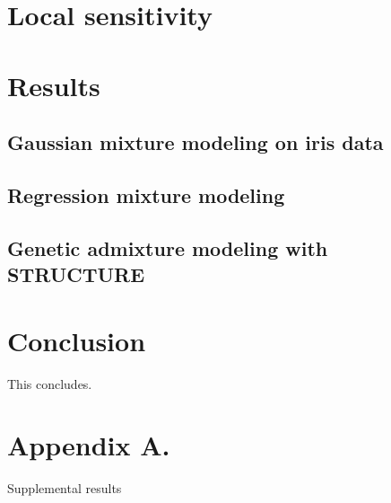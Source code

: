 \documentclass[twoside,11pt]{article}
\begin{document}
\section{Local sensitivity}


\section{Results}

\subsection{Gaussian mixture modeling on iris data}


\subsection{Regression mixture modeling}


\subsection{Genetic admixture modeling with STRUCTURE}


\section{Conclusion}
This concludes.




\newpage

\appendix
\section*{Appendix A.}
\label{app:theorem}

Supplemental results

\vskip 0.2in

\end{document}
